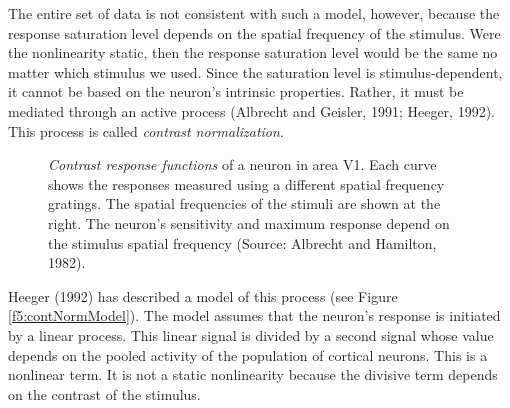The entire set of data is not consistent with such a model, however,
because the response saturation level depends on
the spatial frequency of the stimulus.
Were the nonlinearity  static, then the response saturation level
would be the same no matter which stimulus we used.
Since the saturation level is stimulus-dependent,
it cannot be based on the neuron's intrinsic properties.
Rather, it must be mediated through an active process
(Albrecht and Geisler, 1991; Heeger, 1992).
This process is called {\em contrast normalization}.
\begin{figure}
\centerline{
}
\caption[Contrast Normalization Data]{
{\em Contrast response functions} of a neuron in area V1.
Each curve shows the responses
measured using a different spatial frequency gratings.
The spatial frequencies of the stimuli
are shown at the right.
The neuron's sensitivity and maximum response
depend on the stimulus spatial frequency
(Source: Albrecht and Hamilton, 1982).
}
\label{f5:contNormData}
\end{figure}

Heeger (1992) has described a model of
this process (see Figure \ref{f5:contNormModel}).
The model assumes that the neuron's response is initiated
by a linear process.
This linear signal is divided by a second
signal whose value depends on
the pooled activity of the population of cortical neurons.
This is a nonlinear term.
It is not a static nonlinearity because the divisive term
depends on the contrast of the stimulus.

